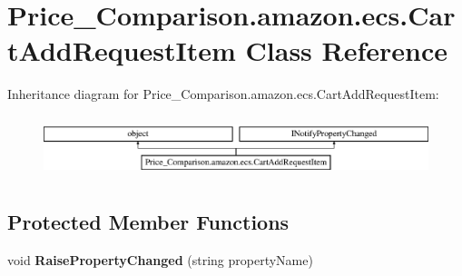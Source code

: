 \hypertarget{class_price___comparison_1_1amazon_1_1ecs_1_1_cart_add_request_item}{\section{Price\-\_\-\-Comparison.\-amazon.\-ecs.\-Cart\-Add\-Request\-Item Class Reference}
\label{class_price___comparison_1_1amazon_1_1ecs_1_1_cart_add_request_item}
}


 


Inheritance diagram for Price\-\_\-\-Comparison.\-amazon.\-ecs.\-Cart\-Add\-Request\-Item\-:\begin{figure}[H]
\begin{center}
\leavevmode
\includegraphics[height=1.794872cm]{class_price___comparison_1_1amazon_1_1ecs_1_1_cart_add_request_item}
\end{center}
\end{figure}
\subsection*{Protected Member Functions}
\begin{DoxyCompactItemize}
\item 
\hypertarget{class_price___comparison_1_1amazon_1_1ecs_1_1_cart_add_request_item_a612fe92c5db14e4aa94c31edaedb9db0}{void {\bfseries Raise\-Property\-Changed} (string property\-Name)}\label{class_price___comparison_1_1amazon_1_1ecs_1_1_cart_add_request_item_a612fe92c5db14e4aa94c31edaedb9db0}

\end{DoxyCompactItemize}
